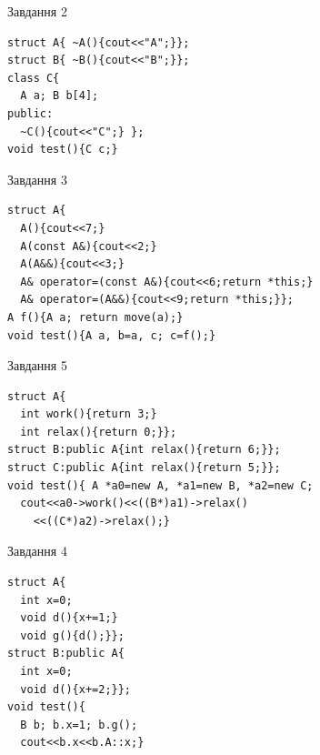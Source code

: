 \documentclass[12pt, ukrainian]{article}
\begin{document}
{{{\begin{minipage}[t]{11cm}
               
{\begin{center}Завдання {2}\end{center}}
\vspace{-6mm}

\begin{verbatim}
struct A{ ~A(){cout<<"A";}};
struct B{ ~B(){cout<<"B";}};
class C{
  A a; B b[4];
public:
  ~C(){cout<<"C";} };
void test(){C c;}
\end{verbatim}            


               
{\begin{center}Завдання {3}\end{center}}
\vspace{-6mm}

\begin{verbatim}
struct A{
  A(){cout<<7;}
  A(const A&){cout<<2;}
  A(A&&){cout<<3;}
  A& operator=(const A&){cout<<6;return *this;}
  A& operator=(A&&){cout<<9;return *this;}};
A f(){A a; return move(a);}
void test(){A a, b=a, c; c=f();}
\end{verbatim}            


               
{\begin{center}Завдання {5}\end{center}}
\vspace{-6mm}

\begin{verbatim}
struct A{
  int work(){return 3;}
  int relax(){return 0;}};
struct B:public A{int relax(){return 6;}};
struct C:public A{int relax(){return 5;}};
void test(){ A *a0=new A, *a1=new B, *a2=new C;
  cout<<a0->work()<<((B*)a1)->relax()
    <<((C*)a2)->relax();}
\end{verbatim}            


\end{minipage}
\vline \hspace{8mm}
\begin{minipage}[t]{7cm}
               
{\begin{center}Завдання {4}\end{center}}
\vspace{-6mm}

\begin{verbatim}
struct A{
  int x=0;
  void d(){x+=1;}
  void g(){d();}};
struct B:public A{
  int x=0;
  void d(){x+=2;}};
void test(){
  B b; b.x=1; b.g();
  cout<<b.x<<b.A::x;}
\end{verbatim}            



\end{minipage}}}}
\end{document}
